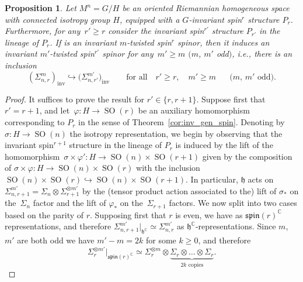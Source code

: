 \documentclass[pdftex]{sigma}
\numberwithin{equation}{section}
\newtheorem{Proposition}[Theorem]{Proposition}
{ \theoremstyle{definition}
	\newtheorem{Definition}[Theorem]{Definition}
	\newtheorem{Note}[Theorem]{Note}
	\newtheorem{Example}[Theorem]{Example}
	\newtheorem{Remark}[Theorem]{Remark} }
\newcommand{\C}{\mathbb{C}} %
\DeclareMathOperator{\inv}{inv}
\DeclareMathOperator{\SO}{SO}
\begin{document}
		\begin{Proposition}Let $M^n=G/H$ be an oriented Riemannian homogeneous space with connected isotropy group $H$, equipped with a $G$-invariant spin$^r$ structure $P_r$. Furthermore, for any~${r'\geq r}$ consider the invariant spin$^{r'}$ structure $P_{r'}$ in the lineage of $P_r$. If \smash{$\psi \in (\Sigma^m_{n,r})_{\inv}$} is an invariant $m$-twisted spin$^r$ spinor, then it induces an invariant $m'$-twisted spin$^{r'}$ spinor for any~${m'\geq m}$ $(m$, $m'$ odd$)$, i.e., there is an inclusion
			\[
			(\Sigma^m_{n,r})_{\mathrm{inv}} \hookrightarrow \bigl(\Sigma^{m'}_{n,r'}\bigr)_{\mathrm{inv}} \qquad \text{for all}\quad r'\geq r, \quad m'\geq m \quad\text{ $(m$, $m'$ odd$)$}.
			\]
		\end{Proposition}
		\begin{proof}
			It suffices to prove the result for $r'\in \{r, r+1\}$. Suppose first that $r'=r+1$, and let~${\varphi \colon H\to \SO(r)}$ be an auxiliary homomorphism corresponding to $P_r$ in the sense of Theorem~\ref{cor:inv_gen_spin}. Denoting by $\sigma\colon H\to \SO(n)$ the isotropy representation, we begin by observing that the invariant spin$^{r+1}$ structure in the lineage of $P_r$ is induced by the lift of the homomorphism~${\sigma\times \varphi' \colon H \to \SO(n)\times \SO(r+1)}$ given by the composition of $\sigma \times \varphi \colon H \to \SO(n)\times \SO(r)$ with the inclusion $\SO(n)\times \SO(r)\hookrightarrow \SO(n)\times \SO(r+1)$. In particular, $\mathfrak{h}$ acts on ${\Sigma_{n,r+1}^{m'}= \Sigma_n \otimes \Sigma_{r+1}^{\otimes m'}}$ by the (tensor product action associated to the) lift of $\sigma_*$ on the~$\Sigma_n$ factor and the lift of $\varphi_*$ on the~$\Sigma_{r+1}$ factors. We now split into two cases based on the parity of $r$. Supposing first that $r$ is even, we have \smash{$\Sigma_{r+1}\rvert_{\mathfrak{spin}(r)^{\C}} \simeq \Sigma_{r}$} as $\mathfrak{spin}(r)^{\C}$ representations, and therefore $\Sigma^{m'}_{n,r+1}\rvert_{\mathfrak{h}^{\C}}\simeq \Sigma^{m'}_{n,r} $ as $\mathfrak{h}^{\C}$-representations. Since $m$, $m'$ are both odd we have $m'-m = 2k$ for some $k\geq 0$, and therefore
 \[
 \Sigma_r^{\otimes m'}\rvert_{\mathfrak{spin}(r)^{\C}}\simeq \Sigma_r^{\otimes m} \otimes \underbrace{\Sigma_r \otimes \dots \otimes \Sigma_r }_{2k \text{ copies}}.
\]

\end{proof}
\end{document}
